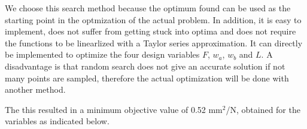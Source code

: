 We choose this search method because the optimum found can be used as the starting point in the optmization of the actual problem. 
In addition, it is easy to implement, does not suffer from getting stuck into optima and does not require the functions to be linearlized with a Taylor series approximation. 
It can directly be implemented to optimize the four design variables $F$, $w_a$, $w_b$ and $L$. 
A disadvantage is that random search does not give an accurate solution if not many points are sampled, therefore the actual optimization will be done with another method.

The this resulted in a minimum objective value of 0.52 mm$^2$/N, obtained for the variables as indicated below.
%





